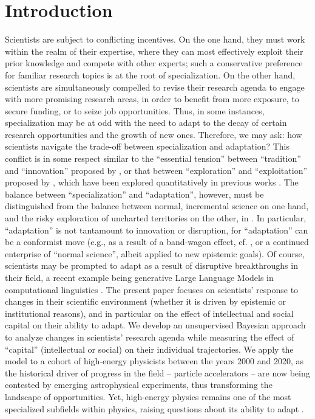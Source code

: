 \documentclass{article}
\begin{document}
\section{Introduction}

Scientists are subject to conflicting incentives. On the one hand, they must work within the realm of their expertise, where they can most effectively exploit their prior knowledge and compete with other experts; such a conservative preference for familiar research topics is at the root of specialization. On the other hand, scientists are simultaneously compelled to revise their research agenda to engage with more promising research areas, in order to benefit from more exposure, to secure funding, or to seize job opportunities. Thus, in some instances, specialization may be at odd with the need to adapt to the decay of certain research opportunities and the growth of new ones. Therefore, we may ask: how scientists navigate the trade-off between specialization and adaptation? This conflict is in some respect similar to the ``essential tension'' between ``tradition'' and ``innovation'' proposed by \citet{Kuhn1997}, or that between ``exploration'' and ``exploitation'' proposed by \citet{March1991}, which have been explored quantitatively in previous works \citep{Foster2015,Jia2017,Aleta2019,Zeng2019,Tripodi2020,Chakresh2023,Feifan2023}%
. The balance between ``specialization'' and ``adaptation'', however, must be distinguished from the balance between normal, incremental science on one hand, and the risky exploration of uncharted territories on the other, in \citet{Foster2015}. In particular, ``adaptation'' is not tantamount to innovation or disruption, for ``adaptation'' can be a conformist move (e.g., as a result of a band-wagon effect, cf. \citealt{Fujimura1988}, or a continued enterprise of ``normal science'', albeit applied to new epistemic goals). Of course, scientists may be prompted to adapt as a result of disruptive breakthroughs in their field, a recent example being generative Large Language Models in computational linguistics \citep{Naomi2023}. The present paper focuses on scientists' response to changes in their scientific environment (whether it is driven by epistemic or institutional reasons), and in particular on the effect of intellectual and social capital on their ability to adapt. We develop an unsupervised Bayesian approach to analyze changes in scientists' research agenda while measuring the effect of ``capital'' (intellectual or social) on their individual trajectories. We apply the model to a cohort of high-energy physicists between the years 2000 and 2020, as the historical driver of progress in the field -- particle accelerators -- are now being contested by emerging astrophysical experiments, thus transforming the landscape of opportunities. Yet, high-energy physics remains one of the most specialized subfields within physics, raising questions about its ability to adapt \citep{Battiston2019,Aleta2019}.
\end{document}
